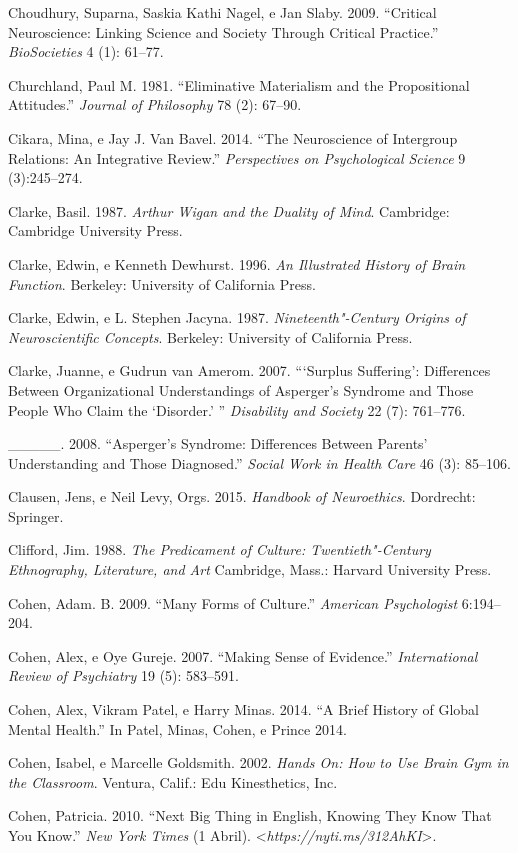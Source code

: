 {\begin{Parskip}
Choudhury, Suparna, Saskia Kathi Nagel, e Jan Slaby. 2009. ``Critical
Neuroscience: Linking Science and Society Through Critical Practice.''
\emph{BioSocieties} 4 (1): 61--77.

Churchland, Paul M. 1981. ``Eliminative Materialism and the
Propositional Attitudes.'' \emph{Journal of Philosophy} 78 (2): 67--90.

Cikara, Mina, e Jay J. Van Bavel. 2014. ``The Neuroscience of Intergroup
Relations: An Integrative Review.'' \emph{Perspectives on Psychological
Science} 9 (3):245--274.

Clarke, Basil. 1987. \emph{Arthur Wigan and the Duality of Mind}.
Cambridge: Cambridge University Press.

Clarke, Edwin, e Kenneth Dewhurst. 1996. \emph{An Illustrated History of
Brain Function}. Berkeley: University of California Press.

Clarke, Edwin, e L. Stephen Jacyna. 1987. \emph{Nineteenth"-Century
Origins of Neuroscientific Concepts}. Berkeley: University of California
Press.

Clarke, Juanne, e Gudrun van Amerom. 2007. ```Surplus Suffering':
Differences Between Organizational Understandings of Asperger's Syndrome
and Those People Who Claim the `Disorder.' '' \emph{Disability and
Society} 22 (7): 761--776.

\_\_\_\_\_. 2008. ``Asperger's Syndrome: Differences Between Parents'
Understanding and Those Diagnosed.'' \emph{Social Work in Health Care}
46 (3): 85--106.

Clausen, Jens, e Neil Levy, Orgs. 2015. \emph{Handbook of Neuroethics}.
Dordrecht: Springer.

Clifford, Jim. 1988. \emph{The Predicament of Culture: Twentieth"-Century
Ethnography, Literature, and Art} Cambridge, Mass.: Harvard University
Press.

Cohen, Adam. B. 2009. ``Many Forms of Culture.'' \emph{American
Psychologist} 6:194--204.

Cohen, Alex, e Oye Gureje. 2007. ``Making Sense of Evidence.''
\emph{International Review of Psychiatry} 19 (5): 583--591.

Cohen, Alex, Vikram Patel, e Harry Minas. 2014. ``A Brief History of
Global Mental Health.'' In Patel, Minas, Cohen, e Prince 2014.

Cohen, Isabel, e Marcelle Goldsmith. 2002. \emph{Hands On: How to Use
Brain Gym in the Classroom}. Ventura, Calif.: Edu Kinesthetics, Inc.

Cohen, Patricia. 2010. ``Next Big Thing in English, Knowing They Know
That You Know.'' \emph{New York Times} (1 Abril).
\textless{}\emph{https://nyti.ms/312AhKI}\textgreater{}.


\end{Parskip}}
